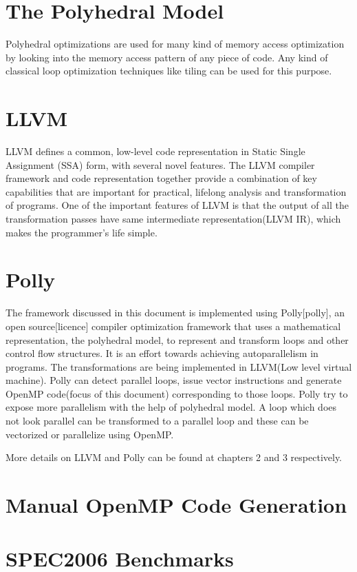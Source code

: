 \documentclass[a4paper,12pt]{book}
\begin{document}
\section{The Polyhedral Model}

Polyhedral optimizations are used for many kind of memory access optimization by
looking into the memory access pattern of any piece of code. Any kind of classical
 loop optimization techniques like tiling can be used for this purpose. 



\section{LLVM}
LLVM defines a common, low-level code representation in Static Single Assignment
(SSA) form, with several novel features. The LLVM compiler framework and code
representation together provide a combination of key capabilities that are
important for practical, lifelong analysis and transformation of programs.
One of the important features of LLVM is that the output of all the
transformation passes have same intermediate representation(LLVM IR), which
makes the programmer’s life simple.

\section{Polly}
The framework discussed in this document is implemented using Polly[polly],
an open source[licence] compiler  optimization framework that uses a mathematical
 representation, the polyhedral model, to represent and transform loops and other
 control flow structures. It is an effort towards achieving autoparallelism in programs.
 The transformations are being implemented in LLVM(Low level virtual machine). 
Polly can detect parallel loops, issue vector instructions and generate OpenMP code(focus of 
this document) corresponding to those loops. Polly try to expose more parallelism
with the help of polyhedral model. A loop which does not look parallel can be transformed
to a parallel loop and these can be vectorized or parallelize using OpenMP.

More details on LLVM and Polly can be found at chapters 2 and 3 respectively.

\section{Manual OpenMP Code Generation}

\section{SPEC2006 Benchmarks}
\end{document}
